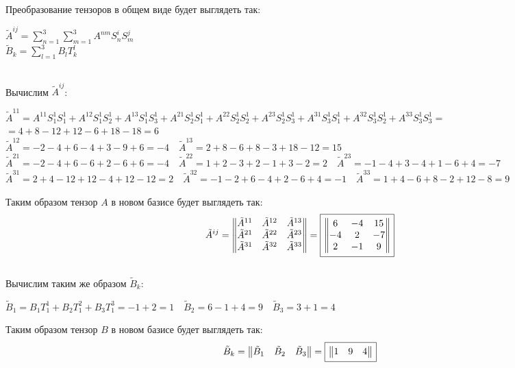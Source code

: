 \documentclass{article}
\newcommand*\squared[1]{\tikz[baseline=(char.base)]{
            \node[shape=rectangle,draw,inner sep=4pt] (char) {#1};}}
\begin{document}
Преобразование тензоров в общем виде будет выглядеть так:
\begin{center}
$\tilde{A}^{ij} = \sum\limits_{n=1}^3\sum\limits_{m=1}^3 A^{nm}S^{i}_{n}S^{j}_{m}$ \\
$\tilde{B}_k = \sum\limits_{l=1}^3 B_lT^l_k$
\end{center} \, \\
Вычислим $\tilde{A}^{ij}$:
\begin{center}
$\tilde{A}^{11} = A^{11}S^{1}_{1}S^{1}_{1} + A^{12}S^{1}_{1}S^{1}_{2} + A^{13}S^{1}_{1}S^{1}_{3} + A^{21}S^{1}_{2}S^{1}_{1} + A^{22}S^{1}_{2}S^{1}_{2} + A^{23}S^{1}_{2}S^{1}_{3} + A^{31}S^{1}_{3}S^{1}_{1} + A^{32}S^{1}_{3}S^{1}_{2} + A^{33}S^{1}_{3}S^{1}_{3} =$ \\
$= 4+8-12+12-6+18-18 = 6$ \\
$\tilde{A}^{12} = -2-4+6-4+3-9+6 = -4 \quad \tilde{A}^{13} = 2+8-6+8-3+18-12 = 15$\\
$\tilde{A}^{21} = -2-4+6-6+2-6+6 = -4 \quad \tilde{A}^{22} = 1+2-3+2-1+3-2 = 2 \quad \tilde{A}^{23} = -1-4+3-4+1-6+4 = -7$ \\
$\tilde{A}^{31} = 2+4-12+12-4+12-12 = 2 \quad \tilde{A}^{32} = -1-2+6-4+2-6+4 = -1 \quad \tilde{A}^{33} = 1+4-6+8-2+12-8 = 9$ \\
\end{center}
Таким образом тензор $A$ в новом базисе будет выглядеть так:
$$\tilde{A}^{ij} = \begin{Vmatrix}
\tilde{A}^{11} & \tilde{A}^{12} & \tilde{A}^{13} \\ \tilde{A}^{21} & \tilde{A}^{22} & \tilde{A}^{23} \\ \tilde{A}^{31} & \tilde{A}^{32} & \tilde{A}^{33}
\end{Vmatrix} = \squared{$\begin{Vmatrix}
6 & -4 & 15 \\ -4 & 2 & -7 \\ 2 & -1 & 9
\end{Vmatrix}$}$$ \, \\
Вычислим таким же образом $\tilde{B}_k$:
\begin{center}
$\tilde{B}_1 = B_1T^1_1 + B_2T^2_1 + B_3T^3_1 = -1+2 = 1 \quad \tilde{B}_2 = 6 -1+4 = 9 \quad \tilde{B}_3 = 3 + 1 = 4$ \\
\end{center}
Таким образом тензор $B$ в новом базисе будет выглядеть так:
$$\tilde{B}_k = \begin{Vmatrix}
\tilde{B}_1 & \tilde{B}_2 & \tilde{B}_3
\end{Vmatrix} = \squared{$\begin{Vmatrix}
1 & 9 & 4
\end{Vmatrix}$}$$
\end{document}
